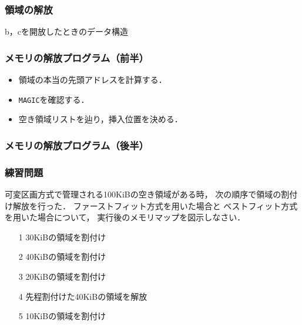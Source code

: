 \documentclass[unicode,handout]{beamer}                   %
\begin{document}
\begin{frame}
  \frametitle{領域の解放}
  b，cを開放したときのデータ構造\\\vfill
  \begin{minipage}{0.49\columnwidth}
  \end{minipage}
  \begin{minipage}{0.49\columnwidth}
  \end{minipage}
\end{frame}

\begin{frame}
  \frametitle{メモリの解放プログラム（前半）}
  \begin{itemize}
  \item 領域の本当の先頭アドレスを計算する．
  \item {\tt MAGIC}を確認する．
  \item 空き領域リストを辿り，挿入位置を決める．
  \end{itemize}
\end{frame}

\begin{frame}
  \frametitle{メモリの解放プログラム（後半）}
\end{frame}

\begin{frame}
  \frametitle{練習問題}
  可変区画方式で管理される100KiBの空き領域がある時，
  次の順序で領域の割付け解放を行った．
  ファーストフィット方式を用いた場合と
  ベストフィット方式を用いた場合について，
  実行後のメモリマップを図示しなさい．

  \begin{enumerate}
  \item[1] 30KiBの領域を割付け
  \item[2] 40KiBの領域を割付け
  \item[3] 20KiBの領域を割付け
  \item[4] 先程割付けた40KiBの領域を解放
  \item[5] 10KiBの領域を割付け
  \end{enumerate}
\end{frame}
\end{document}
